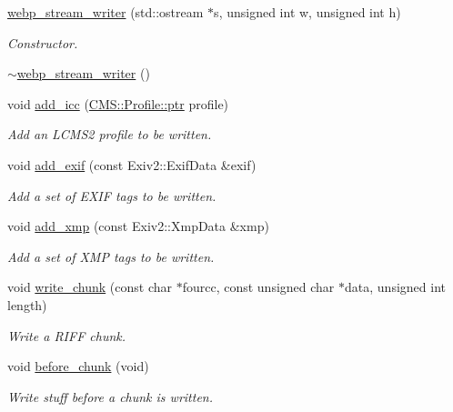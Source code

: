 \begin{DoxyCompactItemize}
\item 
\hyperlink{class_photo_finish_1_1webp__stream__writer_affd26ebc255f3cf910c74cdf577cf3a5}{webp\+\_\+stream\+\_\+writer} (std\+::ostream $\ast$s, unsigned int w, unsigned int h)
\begin{DoxyCompactList}\small\item\em Constructor. \end{DoxyCompactList}\item 
\hyperlink{class_photo_finish_1_1webp__stream__writer_a758557947da2b769223b4c19f58bf030}{$\sim$webp\+\_\+stream\+\_\+writer} ()
\item 
void \hyperlink{class_photo_finish_1_1webp__stream__writer_aafd15e69e86d3e4819eb38baa763854f}{add\+\_\+icc} (\hyperlink{class_c_m_s_1_1_profile_a7d5a80e1317d17dbfdf5ae69820ab08b}{C\+M\+S\+::\+Profile\+::ptr} profile)
\begin{DoxyCompactList}\small\item\em Add an L\+C\+M\+S2 profile to be written. \end{DoxyCompactList}\item 
void \hyperlink{class_photo_finish_1_1webp__stream__writer_adf78aea755773161a6147460ffd6c6cd}{add\+\_\+exif} (const Exiv2\+::\+Exif\+Data \&exif)
\begin{DoxyCompactList}\small\item\em Add a set of E\+X\+IF tags to be written. \end{DoxyCompactList}\item 
void \hyperlink{class_photo_finish_1_1webp__stream__writer_ad22643d45515cfbae75690571f80e55d}{add\+\_\+xmp} (const Exiv2\+::\+Xmp\+Data \&xmp)
\begin{DoxyCompactList}\small\item\em Add a set of X\+MP tags to be written. \end{DoxyCompactList}\item 
void \hyperlink{class_photo_finish_1_1webp__stream__writer_ac5303bc270a92455915601648814d087}{write\+\_\+chunk} (const char $\ast$fourcc, const unsigned char $\ast$data, unsigned int length)
\begin{DoxyCompactList}\small\item\em Write a R\+I\+FF chunk. \end{DoxyCompactList}\item 
void \hyperlink{class_photo_finish_1_1webp__stream__writer_ad5f4e2e62be1f16dd4160bbd8fd2b1cc}{before\+\_\+chunk} (void)
\begin{DoxyCompactList}\small\item\em Write stuff before a chunk is written. \end{DoxyCompactList}\item 

\end{DoxyCompactItemize}
